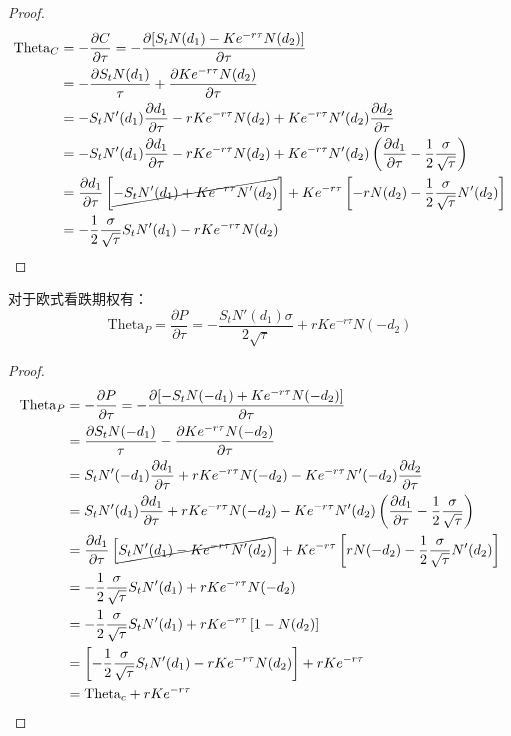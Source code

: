 \documentclass[11pt]{article}
\begin{document}
\begin{proof}
\begin{align*}
    \text{Theta}_C &= -\frac{\partial C}{\partial \tau} = - \frac{\partial [S_t N(d_1) - Ke^{-r\tau} N(d_2)]}{\partial \tau} \\ 
    &= -\frac{\partial S_t N(d_1)}{\tau} + \frac{\partial Ke^{-r\tau} N(d_2)}{\partial \tau} \\ 
    &= -S_t N'(d_1)\frac{\partial d_1}{\partial \tau} - rKe^{-r\tau}N(d_2) + Ke^{-r\tau} N'(d_2)\frac{\partial d_2}{\partial \tau} \\
    &= -S_t N'(d_1)\frac{\partial d_1}{\partial \tau} - rKe^{-r\tau} N(d_2) + Ke^{-r\tau}N'(d_2)\left(\frac{\partial d_1}{\partial \tau} -\frac{1}{2}\frac{\sigma}{\sqrt{\tau}} \right) \\
    &= \frac{\partial d_1}{\partial \tau} \left[\cancel{-S_t N'(d_1) + Ke^{-r\tau} N'(d_2) } \right] + Ke^{-r\tau} \left[ -rN(d_2) -\frac{1}{2}\frac{\sigma}{\sqrt{\tau}} N'(d_2)\right] \\
    &=  -\frac{1}{2}\frac{\sigma}{\sqrt{\tau}}S_t N'(d_1) - rKe^{-r\tau} N(d_2)
\end{align*}
\end{proof}

对于欧式看跌期权有：
\begin{equation*}
    \text{Theta}_P = \frac{\partial P}{\partial \tau} = -\frac{S_t N'(d_1)\sigma}{2\sqrt{\tau}} + r K e^{-r\tau}N(-d_2)
\end{equation*}

\begin{proof}
\begin{align*}
    \text{Theta}_P &= -\frac{\partial P}{\partial \tau} = - \frac{\partial [-S_t N(-d_1) + Ke^{-r\tau} N(-d_2)]}{\partial \tau} \\ 
    &= \frac{\partial S_t N(-d_1)}{\tau} - \frac{\partial Ke^{-r\tau} N(-d_2)}{\partial \tau} \\ 
    &= S_t N'(-d_1)\frac{\partial d_1}{\partial \tau} + rKe^{-r\tau}N(-d_2) - Ke^{-r\tau} N'(-d_2)\frac{\partial d_2}{\partial \tau} \\
    &= S_t N'(d_1)\frac{\partial d_1}{\partial \tau} + r Ke^{-r\tau} N(-d_2) - Ke^{-r\tau}N'(d_2)\left(\frac{\partial d_1}{\partial \tau} -\frac{1}{2}\frac{\sigma}{\sqrt{\tau}} \right) \\
    &= \frac{\partial d_1}{\partial \tau} \left[\cancel{S_t N'(d_1) - Ke^{-r\tau} N'(d_2) } \right] + Ke^{-r\tau} \left[ rN(-d_2) -\frac{1}{2}\frac{\sigma}{\sqrt{\tau}} N'(d_2)\right] \\
    &=  -\frac{1}{2}\frac{\sigma}{\sqrt{\tau}}S_t N'(d_1) + rKe^{-r\tau} N(-d_2) \\
    &=  -\frac{1}{2}\frac{\sigma}{\sqrt{\tau}}S_t N'(d_1) + rKe^{-r\tau} \left[ 1- N(d_2) \right] \\
    &= \left[ -\frac{1}{2}\frac{\sigma}{\sqrt{\tau}}S_t N'(d_1) - rKe^{-r\tau}N(d_2) \right] + rKe^{-r\tau} \\
    & = \text{Theta}_c + rKe^{-r\tau}
\end{align*}
\end{proof}
\end{document}
